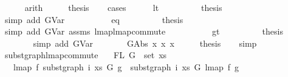 \begin{isabellebody}
\ \ \ \ \isamarkupfalse%
\ arith\isanewline
\ \ \isamarkupfalse%
\ \isamarkupfalse%
\ {\isacharquery}{\kern0pt}thesis\isanewline
\ \ \isamarkupfalse%
\ cases\isanewline
\ \ \ \ \isamarkupfalse%
\ lt\isanewline
\ \ \ \ \ \ \isamarkupfalse%
\ \isamarkupfalse%
\ {\isacharquery}{\kern0pt}thesis\isanewline
\ \ \ \ \ \ \isamarkupfalse%
\ {\isacharparenleft}{\kern0pt}simp\ add{\isacharcolon}{\kern0pt}\ GVar{\isacharparenright}{\kern0pt}\isanewline
\ \ \ \ \isamarkupfalse%
\isanewline
\ \ \ \ \isamarkupfalse%
\ eq\isanewline
\ \ \ \ \ \ \isamarkupfalse%
\ \isamarkupfalse%
\ {\isacharquery}{\kern0pt}thesis\isanewline
\ \ \ \ \ \ \isamarkupfalse%
\ {\isacharparenleft}{\kern0pt}simp\ add{\isacharcolon}{\kern0pt}\ GVar\ assms{\isacharparenleft}{\kern0pt}{}{\isacharparenright}{\kern0pt}\ lmap{\isacharunderscore}{\kern0pt}lmap{\isacharunderscore}{\kern0pt}commute{\isacharparenright}{\kern0pt}\isanewline
\ \ \ \ \isamarkupfalse%
\isanewline
\ \ \ \ \isamarkupfalse%
\ gt\isanewline
\ \ \ \ \ \ \isamarkupfalse%
\ \isamarkupfalse%
\ {\isacharquery}{\kern0pt}thesis\isanewline
\ \ \ \ \ \ \isamarkupfalse%
\ {\isacharparenleft}{\kern0pt}simp\ add{\isacharcolon}{\kern0pt}\ GVar{\isacharparenright}{\kern0pt}\isanewline
\ \ \ \isamarkupfalse%
\isanewline
{}\isamarkupfalse%
\isanewline
\ \ \isamarkupfalse%
\ {\isacharparenleft}{\kern0pt}GAbs\ x{}{}\ x{}{}\ x{}{}{\isacharparenright}{\kern0pt}\isanewline
\ \ \isamarkupfalse%
\ \isamarkupfalse%
\ {\isacharquery}{\kern0pt}thesis\isanewline
\ \ \isamarkupfalse%
\ simp\isanewline
{}\isamarkupfalse%
%
\endisatagproof
{\isafoldproof}%
%
\isadelimproof
\isanewline
%
\endisadelimproof
\isanewline
\isanewline
{}\isamarkupfalse%
\ subst{\isacharunderscore}{\kern0pt}graph{\isacharunderscore}{\kern0pt}lmap{\isacharunderscore}{\kern0pt}commute{\isacharcolon}{\kern0pt}\isanewline
\ \ \ {\isachardoublequoteopen}FL\ G\ {\isasymsubseteq}\ set\ xs{\isachardoublequoteclose}\isanewline
\ \ \ {\isachardoublequoteopen}lmap\ f\ {\isacharparenleft}{\kern0pt}subst{\isacharunderscore}{\kern0pt}graph\ i\ xs\ G\ g{}{\isacharparenright}{\kern0pt}\ {\isacharequal}{\kern0pt}\ subst{\isacharunderscore}{\kern0pt}graph\ i\ xs\ G\ {\isacharparenleft}{\kern0pt}lmap\ f\ g{}{\isacharparenright}{\kern0pt}{\isachardoublequoteclose}\isanewline

\end{isabellebody}
